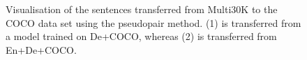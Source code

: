 \begin{figure}[t]
\caption{Visualisation of the sentences transferred from Multi30K to the COCO data set using the pseudopair method. (1) is transferred from a model trained on De+COCO, whereas (2) is transferred from En+De+COCO.}
\label{fig:pseudopairs}
\end{figure}

